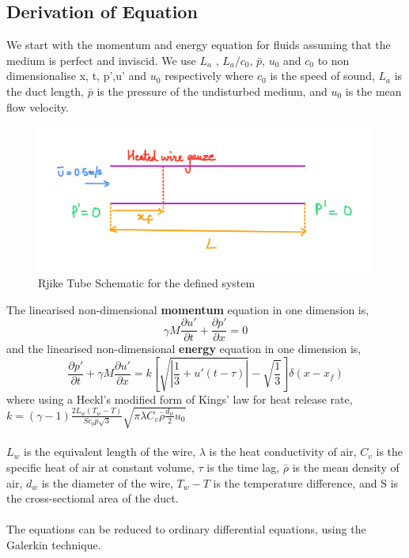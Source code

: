\documentclass[8pt]{article} %
\begin{document}
\subsection{Derivation of  Equation}
We start with the momentum and energy equation for fluids assuming that the medium is perfect and inviscid. We use $L_a$ , $L_a/c_0$, $\bar{p}$, $u_0$ and $c_0$ to non dimensionalise x, t, p',u' and $u_0$ respectively where $c_0$ is the speed of sound, $L_a$ is the duct length, $\bar{p}$ is the pressure of the undisturbed medium, and $u_0$ is the mean flow velocity. 
\begin{figure}[H]
    \centering
    \includegraphics[width=0.4\linewidth]{schematic}
    \caption{Rjike Tube Schematic for the defined system}
    \label{fig:schematic}
\end{figure}
\noindent The linearised non-dimensional \textbf{momentum} equation in one dimension is,
\begin{equation}\label{e:m}
\gamma M \frac{\partial {u'}}{\partial {t}} + \frac{\partial {p'}}{\partial {x}} = 0
\end{equation}
and the linearised non-dimensional \textbf{energy} equation in one dimension is,
\begin{equation}\label{e:e}
\frac{\partial {p'}}{\partial {t}} + \gamma M \frac{\partial {u'}}{\partial {x}} = k \left[ \sqrt{\left| \frac{1}{3} + u'(t-\tau)\right| } - \sqrt{\frac{1}{3}} \right] \delta(x - x_f)
\end{equation}
where using a Heckl's modified form of Kings' law for heat release rate,\\
$k = \left( \gamma − 1 \right) \frac{2 L_w ( T_w − T )}{S c_0 \bar{p} \sqrt{3}} \sqrt{\pi \lambda C_v \bar{\rho} \frac{d_w}{2} u_0}$\\\\ 
$L_w$ is the equivalent length of the wire, $\lambda$ is the heat conductivity of air, $C_v$ is the specific heat of air at constant volume, $\tau$ is the time lag, $\bar{\rho}$ is the mean density of air, $d_w$ is the diameter of the wire, $T_w − T$ is the temperature difference, and S is the cross-sectional area of the duct.\\\\
The equations can be reduced to ordinary differential equations, using the Galerkin technique.
\end{document}
